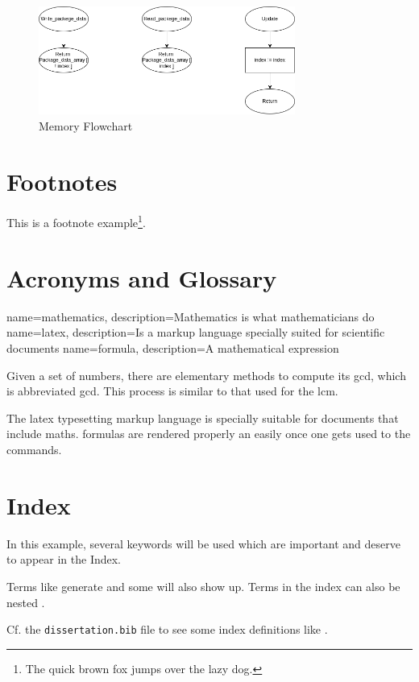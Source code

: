 \begin{figure}[H]
    \centering
    \includegraphics[width=0.75\textwidth]{images/diagrams/data_struct/fluxogram.png}  %
    \caption{Memory Flowchart}
    \label{fig:Memory Flowchart}        
\end{figure}
\section{Footnotes}
This is a footnote example\footnote{The quick brown fox jumps over the lazy dog.}.

\section{Acronyms and Glossary}
{
    name=mathematics,
    description={Mathematics is what mathematicians do}
}
{
    name=latex,
    description={Is a markup language specially suited for 
scientific documents}
}
{
    name=formula,
    description={A mathematical expression}
}

Given a set of numbers, there are elementary methods to compute 
its \acrlong{gcd}, which is abbreviated \acrshort{gcd}. This process 
is similar to that used for the \acrfull{lcm}.

The \Gls{latex} typesetting markup language is specially suitable 
for documents that include \gls{maths}. \Glspl{formula} are rendered 
properly an easily once one gets used to the commands.

\section{Index}

In this example, several keywords will be used 
which are important and deserve to appear in the Index.

Terms like generate and some will also 
show up. Terms in the index can also be nested .

Cf. the \texttt{dissertation.bib} file to see some index definitions like .
